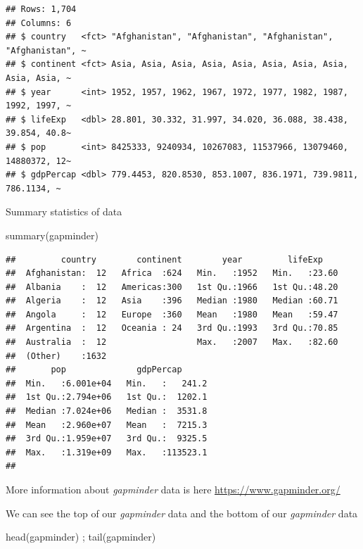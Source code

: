 \documentclass[
]{book}
\makeatletter
\newenvironment{Shaded}{\begin{snugshade}}{\end{snugshade}}
\newcommand{\FunctionTok}[1]{\textcolor[rgb]{0,0,0}{#1}}
\newcommand{\NormalTok}[1]{#1}
\newenvironment{kframe}{%
\medskip{}
\setlength{\fboxsep}{.8em}
 \def\at@end@of@kframe{}%
 \ifinner\ifhmode%
  \def\at@end@of@kframe{\end{minipage}}%
  \begin{minipage}{\columnwidth}%
 \fi\fi%
 \def\FrameCommand##1{\hskip\@totalleftmargin \hskip-\fboxsep
 \colorbox{shadecolor}{##1}\hskip-\fboxsep
     \hskip-\linewidth \hskip-\@totalleftmargin \hskip\columnwidth}%
 \MakeFramed {\advance\hsize-\width
   \@totalleftmargin\z@ \linewidth\hsize
   \@setminipage}}%
 {\par\unskip\endMakeFramed%
 \at@end@of@kframe}
\renewenvironment{Shaded}{\begin{kframe}}{\end{kframe}}
\makeatother
\begin{document}
\begin{verbatim}
## Rows: 1,704
## Columns: 6
## $ country   <fct> "Afghanistan", "Afghanistan", "Afghanistan", "Afghanistan", ~
## $ continent <fct> Asia, Asia, Asia, Asia, Asia, Asia, Asia, Asia, Asia, Asia, ~
## $ year      <int> 1952, 1957, 1962, 1967, 1972, 1977, 1982, 1987, 1992, 1997, ~
## $ lifeExp   <dbl> 28.801, 30.332, 31.997, 34.020, 36.088, 38.438, 39.854, 40.8~
## $ pop       <int> 8425333, 9240934, 10267083, 11537966, 13079460, 14880372, 12~
## $ gdpPercap <dbl> 779.4453, 820.8530, 853.1007, 836.1971, 739.9811, 786.1134, ~
\end{verbatim}

Summary statistics of data

\begin{Shaded}
\begin{Highlighting}[]
\FunctionTok{summary}\NormalTok{(gapminder)}
\end{Highlighting}
\end{Shaded}

\begin{verbatim}
##         country        continent        year         lifeExp     
##  Afghanistan:  12   Africa  :624   Min.   :1952   Min.   :23.60  
##  Albania    :  12   Americas:300   1st Qu.:1966   1st Qu.:48.20  
##  Algeria    :  12   Asia    :396   Median :1980   Median :60.71  
##  Angola     :  12   Europe  :360   Mean   :1980   Mean   :59.47  
##  Argentina  :  12   Oceania : 24   3rd Qu.:1993   3rd Qu.:70.85  
##  Australia  :  12                  Max.   :2007   Max.   :82.60  
##  (Other)    :1632                                                
##       pop              gdpPercap       
##  Min.   :6.001e+04   Min.   :   241.2  
##  1st Qu.:2.794e+06   1st Qu.:  1202.1  
##  Median :7.024e+06   Median :  3531.8  
##  Mean   :2.960e+07   Mean   :  7215.3  
##  3rd Qu.:1.959e+07   3rd Qu.:  9325.5  
##  Max.   :1.319e+09   Max.   :113523.1  
## 
\end{verbatim}

More information about \emph{gapminder} data is here \url{https://www.gapminder.org/}

We can see the top of our \emph{gapminder} data and the bottom of our \emph{gapminder} data

\begin{Shaded}
\begin{Highlighting}[]
\FunctionTok{head}\NormalTok{(gapminder) ; }\FunctionTok{tail}\NormalTok{(gapminder)}
\end{Highlighting}
\end{Shaded}
\end{document}
